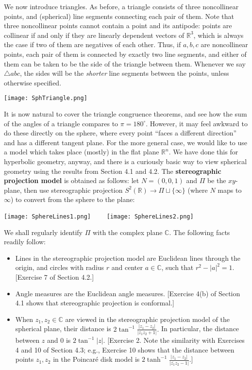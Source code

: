\documentclass[leqno]{book}
\begin{document}
\noindent We now introduce triangles.  As before, a triangle consists of three noncollinear points, and (spherical) line segments connecting each pair of them.  Note that three noncollinear points cannot contain a point and its antipode: points are collinear if and only if they are linearly dependent vectors of $\mathbb R^3$, which is always the case if two of them are negatives of each other.  Thus, if $a,b,c$ are noncollinear points, each pair of them is connected by exactly two line segments, and either of them can be taken to be the side of the triangle between them.  Whenever we say $\triangle abc$, the sides will be the \emph{shorter} line segments between the points, unless otherwise specified.
\begin{center}
\texttt{[image: SphTriangle.png]}
\end{center}
It is now natural to cover the triangle congruence theorems, and see how the sum of the angles of a triangle compares to $\pi=180^\circ$.  However, it may feel awkward to do these directly on the sphere, where every point ``faces a different direction'' and has a different tangent plane.  For the more general case, we would like to use a model which takes place (mostly) in the flat plane $\mathbb R^n$.  We have done this for hyperbolic geometry, anyway, and there is a curiously basic way to view spherical geometry using the results from Section 4.1 and 4.2.
The \textbf{stereographic projection model} is obtained as follows: let $N=(0,0,1)$ and $\Pi$ be the $xy$-plane, then use stereographic projection $S^2(\mathbb R)\to\Pi\sqcup\{\infty\}$ (where $N$ maps to $\infty$) to convert from the sphere to the plane:
\begin{center}
\texttt{[image: SphereLines1.png]}~~~~
\texttt{[image: SphereLines2.png]}%
\end{center}
We shall regularly identify $\Pi$ with the complex plane $\mathbb C$.  The following facts readily follow:
\begin{itemize}
\item Lines in the stereographic projection model are Euclidean lines through the origin, and circles with radius $r$ and center $a\in\mathbb C$, such that $r^2-|a|^2=1$.  [Exercise 7 of Section 4.2.]

\item Angle measures are the Euclidean angle measures.  [Exercise 4(b) of Section 4.1 shows that stereographic projection is conformal.]

\item When $z_1,z_2\in\mathbb C$ are viewed in the stereographic projection model of the spherical plane, their distance is $2\tan^{-1}\frac{|z_1-z_2|}{|\overline{z_1}z_2+1|}.$
In particular, the distance between $z$ and $0$ is $2\tan^{-1}|z|$.  [Exercise 2.  Note the similarity with Exercises 4 and 10 of Section 4.3; e.g., Exercise 10 shows that the distance between points $z_1,z_2$ in the Poincar\'e disk model is $2\tanh^{-1}\frac{|z_1-z_2|}{|\overline{z_1}z_2-1|}$.]
\end{itemize}
\end{document}
